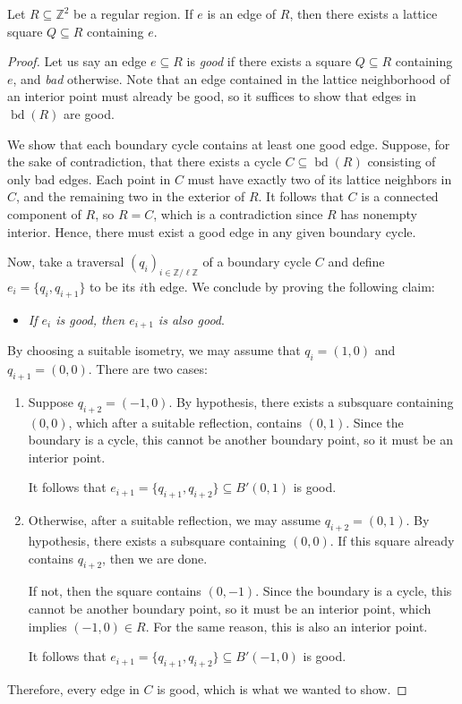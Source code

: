 \begin{proposition}\label{prop:gridlike}
Let $R \subseteq \mathbb{Z}^2$ be a regular region. If $e$ is an edge of $R$, then there exists a lattice square $Q \subseteq R$ containing $e$.
\end{proposition}
\begin{proof}
  Let us say an edge $e \subseteq R$ is \emph{good} if there exists a square $Q \subseteq R$ containing $e$, and \emph{bad} otherwise.
  Note that an edge contained in the lattice neighborhood of an interior point must already be good, so it suffices to show that edges in $\operatorname{bd}(R)$ are good.

  We show that each boundary cycle contains at least one good edge.
  Suppose, for the sake of contradiction, that there exists a cycle $C \subseteq \operatorname{bd}(R)$ consisting of only bad edges.
  Each point in $C$ must have exactly two of its lattice neighbors in $C$, and the remaining two in the exterior of $R$.
  It follows that $C$ is a connected component of $R$, so $R = C$, which is a contradiction since $R$ has nonempty interior.
  Hence, there must exist a good edge in any given boundary cycle.

  Now, take a traversal $(q_{i})_{i \in \mathbb{Z}/\ell\mathbb{Z}}$ of a boundary cycle $C$ and define $e_i = \{q_i, q_{i+1}\}$ to be its $i$th edge. 
  We conclude by proving the following claim:
  \begin{itemize}
    \item[($\star$)] \emph{If $e_{i}$ is good, then $e_{i+1}$ is also good}.
  \end{itemize}
  By choosing a suitable isometry, we may assume that $q_{i} = (1, 0)$ and $q_{i+1} = (0, 0)$.
  There are two cases: 
  \begin{enumerate}
    \item Suppose $q_{i+2} = (-1, 0)$. By hypothesis, there exists a subsquare containing $(0, 0)$, which after a suitable reflection, contains $(0, 1)$.
    Since the boundary is a cycle, this cannot be another boundary point, so it must be an interior point.
    
    It follows that $e_{i+1} = \{q_{i+1}, q_{i+2}\} \subseteq B'(0, 1)$ is good.

    \item Otherwise, after a suitable reflection, we may assume $q_{i+2} = (0, 1)$. By hypothesis, there exists a subsquare containing $(0, 0)$. If this square already contains $q_{i+2}$, then we are done.

    If not, then the square contains $(0, -1)$. 
    Since the boundary is a cycle, this cannot be another boundary point, so it must be an interior point, which implies $(-1, 0) \in R$.
    For the same reason, this is also an interior point.
    
    It follows that $e_{i+1} = \{q_{i+1}, q_{i+2}\} \subseteq B'(-1, 0)$ is good.
  \end{enumerate}
  Therefore, every edge in $C$ is good, which is what we wanted to show.
\end{proof}

